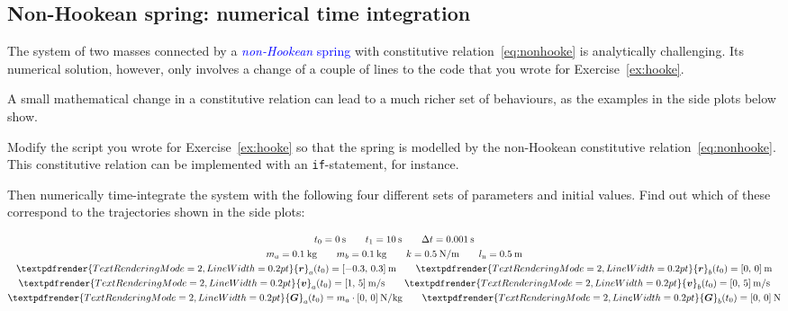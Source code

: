 \documentclass[a4paper,12pt,%
onecolumn,oneside,%
british%
]{memoir}
\renewcommand*{\bm}[1]{\textpdfrender{TextRenderingMode=2,LineWidth=0.2pt}{\boldsymbol{#1}}}
\newcommand*{\incr}{\Delta}%
\renewcommand*{\|}[1][]{\nonscript\:#1\vert\nonscript\:\mathopen{}}
\newcommand*{\sect}{\S}%
\renewcommand*{\autoref}[2]{\sidepar{\vspace{-1ex}\footnotesize{\color{blue}\faIcon{%
angle-right%
}\enspace\sect~\ref{#1} page~\pageref{#1}}}\textcolor{blue}{#2}}
\newcommand*{\yr}{\bm{r}}
\newcommand*{\yra}{\yr_{a}}
\newcommand*{\yrb}{\yr_{b}}
\newcommand*{\yv}{\bm{v}}
\newcommand*{\yva}{\yv_{a}}
\newcommand*{\yvb}{\yv_{b}}
\newcommand*{\ylo}{l_{\textrm{n}}}
\newcommand*{\yti}{t_{0}}
\newcommand*{\ytf}{t_{1}}
\newcommand*{\Dt}{\incr t}
\newcommand*{\yM}{m}%
\newcommand*{\yMa}{\yM_{a}}
\newcommand*{\yMb}{\yM_{b}}
\newcommand*{\yG}{\bm{G}}
\newcommand*{\yGa}{\yG_{a}}
\newcommand*{\yGb}{\yG_{b}}
\begin{document}
\subsection{Non-Hookean spring: numerical time integration}
\label{sec:nonHooke_simulation}

The system of two masses connected by a \autoref{sec:nonhooke}{\emph{non-Hookean} spring} with constitutive relation~\eqref{eq:nonhooke} is analytically challenging.
Its numerical solution, however, only involves a change of a couple of lines to the code that you wrote for Exercise~\ref{ex:hooke}.

A small mathematical change in a constitutive relation can lead to a much richer set of behaviours, as the examples in the side plots below show.

\begin{exercise}[label={ex:nonhooke}]
  Modify the script you wrote for Exercise~\ref{ex:hooke} so that the spring is modelled by the non-Hookean constitutive relation~\eqref{eq:nonhooke}. This constitutive relation can be implemented with an \texttt{if}-statement, for instance.

  Then numerically time-integrate the system with the following four different sets of parameters and initial values. Find out which of these correspond to the trajectories shown in the side plots:
\begin{description}[itemsep=\baselineskip]
      \item[Set 1:]
        \begin{equation*}
      \begin{gathered}
        \yti=\qty{0}{s}
        \qquad
        \ytf=\qty{10}{s}
        \qquad
        \Dt = \qty{0.001}{s}
        \\
        \yMa=\qty{0.1}{kg}
        \qquad
        \yMb=\qty{0.1}{kg}
        \qquad
        k=\qty{0.5}{N/m}
        \qquad
        \ylo = \qty{0.5}{m}
        \\
        \yra(\yti)=[\num{-0.3},\, \num{0.3}]\:\unit{m}
        \qquad
        \yrb(\yti)=[\num{0},\, \num{0}]\:\unit{m}
        \\
        \yva(\yti)=[\num{1},\, \num{5}]\:\unit{m/s}
        \qquad
        \yvb(\yti)=[\num{0},\, \num{5}]\:\unit{m/s}
        \\
        \yGa(\yti)= \yMa\cdot[\num{0},\, \num{0}]\:\unit{N/kg}
        \qquad
        \yGb(\yti)=[\num{0},\, \num{0}]\:\unit{N}
      \end{gathered}
    \end{equation*}


\end{description}
\end{exercise}
\end{document}
